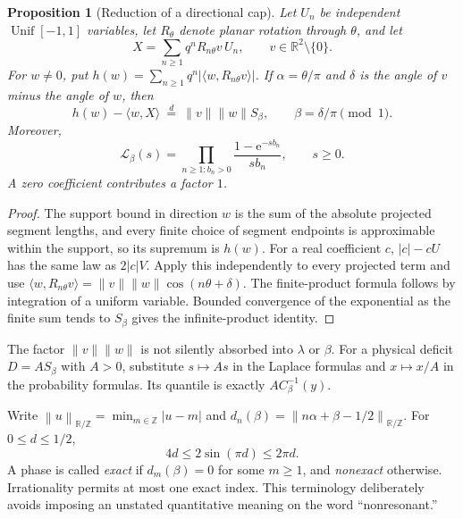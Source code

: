 \documentclass[11pt,a4paper]{article}
\newtheorem{proposition}[theorem]{Proposition}
\theoremstyle{definition}
\theoremstyle{remark}\newtheorem{remark}[theorem]{Remark}
\newcommand{\R}{\mathbb R}
\newcommand{\T}{\mathbb R/\mathbb Z}
\newcommand{\Unif}{\operatorname{Unif}}
\newcommand{\dn}[1]{\left\|#1\right\|_{\T}}
\newcommand{\LL}{\mathcal L}
\newcommand{\e}{\mathrm e}
\begin{document}
\begin{proposition}[Reduction of a directional cap]
\label{prop:cap}
Let $U_n$ be independent $\Unif[-1,1]$ variables, let $R_\theta$ denote planar
rotation through $\theta$, and let
\[
 X=\sum_{n\ge1}q^nR_{n\theta}v\,U_n,
 \qquad v\in\R^2\setminus\{0\}.
\]
For $w\ne0$, put
$h(w)=\sum_{n\ge1}q^n|\langle w,R_{n\theta}v\rangle|$.
If $\alpha=\theta/\pi$ and $\delta$ is the angle of $v$ minus the angle of
$w$, then
\[
 h(w)-\langle w,X\rangle\ \overset{d}=\
 \|v\|\|w\|S_\beta,\qquad \beta=\delta/\pi\pmod1.
\]
Moreover,
\begin{equation}
 \LL_\beta(s)=\prod_{n\ge1:b_n>0}
            \frac{1-\e^{-sb_n}}{sb_n},\qquad s\ge0.
 \label{eq:product}
\end{equation}
A zero coefficient contributes a factor $1$.
\end{proposition}
\begin{proof}
The support bound in direction $w$ is the sum of the absolute projected
segment lengths, and every finite choice of segment endpoints is approximable
within the support, so its supremum is $h(w)$.  For a real coefficient $c$,
$|c|-cU$ has the same law as $2|c|V$.  Apply this independently to every
projected term and use
$\langle w,R_{n\theta}v\rangle=\|v\|\|w\|\cos(n\theta+\delta)$.
The finite-product formula follows by integration of a uniform variable.
Bounded convergence of the exponential as the finite sum tends to $S_\beta$
gives the infinite-product identity.
\end{proof}

The factor $\|v\|\|w\|$ is not silently absorbed into $\lambda$ or $\beta$.
For a physical deficit $D=A S_\beta$ with $A>0$, substitute $s\mapsto As$ in
the Laplace formulas and $x\mapsto x/A$ in the probability formulas.  Its
quantile is exactly $A C_\beta^{-1}(y)$.

Write $\dn{u}=\min_{m\in\mathbb Z}|u-m|$ and
$d_n(\beta)=\dn{n\alpha+\beta-1/2}$.  For $0\le d\le1/2$,
\begin{equation}
 4d\le2\sin(\pi d)\le2\pi d.
 \label{eq:distance-amplitude}
\end{equation}
A phase is called \emph{exact} if $d_m(\beta)=0$ for some $m\ge1$, and
\emph{nonexact} otherwise.  Irrationality permits at most one exact index.
This terminology deliberately avoids imposing an unstated quantitative
meaning on the word ``nonresonant.''
\end{document}
